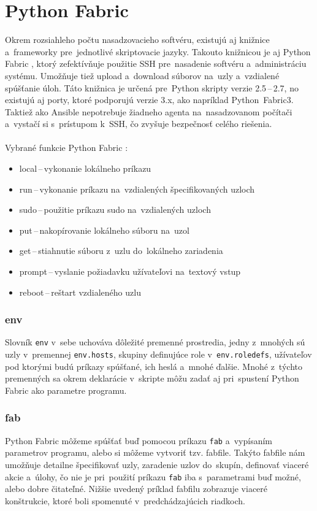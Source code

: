 \section{\mbox{Python} Fabric}
Okrem rozsiahleho počtu nasadzovacieho softvéru, existujú aj knižnice a~frameworky pre~jednotlivé skriptovacie jazyky. Takouto knižnicou je aj \mbox{Python} Fabric \cite{python-fabric}, ktorý zefektívňuje použitie SSH pre~nasadenie softvéru a~administráciu systému. Umožňuje tiež upload a~download súborov na~uzly a~vzdialené spúšťanie úloh. Táto knižnica je určená pre~\mbox{Python} skripty verzie 2.5\,--\,2.7, no existujú aj porty, ktoré podporujú verzie 3.x, ako napríklad \mbox{Python Fabric3}. Taktiež ako Ansible nepotrebuje žiadneho agenta na~nasadzovanom počítači a~vystačí si s~prístupom k~SSH, čo zvyšuje bezpečnosť celého riešenia.
\\\\
Vybrané funkcie \mbox{Python} Fabric \cite{python-fabric}:
\begin{itemize}
	\item local\,--\,vykonanie lokálneho príkazu
	\item run\,--\,vykonanie príkazu na~vzdialených špecifikovaných uzloch
	\item sudo\,--\,použitie príkazu sudo na~vzdialených uzloch
	\item put\,--\,nakopírovanie lokálneho súboru na~uzol
	\item get\,--\,stiahnutie súboru z~uzlu do~lokálneho zariadenia
	\item prompt\,--\,vyslanie požiadavku užívateľovi na~textový vstup
	\item reboot\,--\,reštart vzdialeného uzlu
\end{itemize}

\subsubsection*{env}
Slovník \texttt{env} v~sebe uchováva dôležité premenné prostredia, jedny z~mnohých sú uzly v~premennej \texttt{env.hosts}, skupiny definujúce role v~\texttt{env.roledefs}, užívateľov pod ktorými budú príkazy spúšťané, ich heslá a~mnohé ďalšie. Mnohé z~týchto premenných sa okrem deklarácie v~skripte môžu zadať aj pri~spustení \mbox{Python} Fabric ako parametre programu. 

\subsubsection*{fab}
\mbox{Python} Fabric môžeme spúšťať buď pomocou príkazu \texttt{fab} a~vypísaním parametrov programu, alebo si môžeme vytvoriť tzv. fabfile. Takýto fabfile nám umožňuje detailne špecifikovať uzly, zaradenie uzlov do~skupín, definovať viaceré akcie a~úlohy, čo nie je pri~použití príkazu \texttt{fab} iba s~parametrami buď možné, alebo dobre čitateľné. Nižšie uvedený príklad fabfilu zobrazuje viaceré konštrukcie, ktoré boli spomenuté v~predchádzajúcich riadkoch. 

